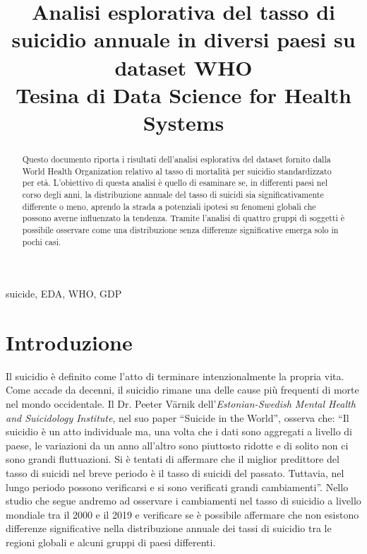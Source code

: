 \documentclass[conference]{IEEEtran}
\begin{document}
\title{Analisi esplorativa del tasso di suicidio annuale in diversi paesi su dataset WHO\\
{\footnotesize Tesina di Data Science for Health Systems}
}

\author{
}

\maketitle

\begin{abstract}
Questo documento riporta i risultati dell'analisi esplorativa del dataset fornito dalla
World Health Organization relativo al tasso di mortalità per suicidio standardizzato per età.
L'obiettivo di questa analisi è quello di esaminare se, in differenti paesi nel corso degli anni,
la distribuzione annuale del tasso di suicidi sia significativamente differente o meno,
aprendo la strada a potenziali
ipotesi su fenomeni globali che possono averne influenzato la tendenza.
Tramite l'analisi di quattro gruppi di soggetti è possibile osservare come una
distribuzione senza differenze significative emerga solo in pochi casi.
\end{abstract}

\begin{IEEEkeywords}
suicide, EDA, WHO, GDP
\end{IEEEkeywords}

\section{Introduzione}
Il suicidio è definito come l'atto di terminare intenzionalmente la propria vita\cite{b1}.
Come accade da decenni, il suicidio rimane una delle cause più
frequenti di morte nel mondo occidentale\cite{b2}.
Il Dr. Peeter V\"arnik dell'\emph{Estonian-Swedish Mental Health
and Suicidology Institute}, nel suo paper ``Suicide in the World''\cite{b3}, 
osserva che:
``Il suicidio è un atto individuale ma, una volta che i dati sono aggregati a
livello di paese, le variazioni da un anno all'altro sono piuttosto ridotte e
di solito non ci sono grandi fluttuazioni. Si è tentati di affermare che
il miglior predittore del tasso di suicidi nel breve periodo è il tasso di suicidi del passato.
Tuttavia, nel lungo periodo possono verificarsi e si sono verificati grandi cambiamenti''.
Nello studio che segue andremo ad osservare i cambiamenti nel tasso di suicidio 
a livello mondiale tra il 2000 e il 2019 e verificare se è possibile affermare
che non esistono differenze significative nella distribuzione annuale dei tassi di suicidio
tra le regioni globali e alcuni gruppi di paesi differenti.
\end{document}
